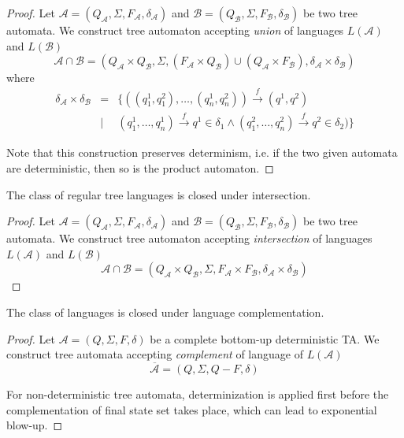 \begin{proof}
Let $\mathcal{A} = (Q_\mathcal{A}, \Sigma, F_\mathcal{A}, \delta_\mathcal{A})$ and $\mathcal{B} = (Q_\mathcal{B}, \Sigma, F_\mathcal{B}, \delta_\mathcal{B})$ be two tree automata. We construct tree automaton accepting \emph{union} of languages $L(\mathcal{A})$ and $L(\mathcal{B})$  $$\mathcal{A} \cap \mathcal{B} = (Q_\mathcal{A} \times Q_\mathcal{B}, \Sigma, (F_\mathcal{A} \times Q_\mathcal{B}) \cup (Q_\mathcal{A} \times F_\mathcal{B}), \delta_\mathcal{A} \times \delta_\mathcal{B})$$ where
 \begin{eqnarray*}
 \delta_\mathcal{A} \times \delta_\mathcal{B} & = & \{ ((q^1_1,q^2_1),\ldots,(q^1_n,q^2_n)) \overset{f}{\longrightarrow} (q^1, q^2)\\ 
  & | & (q^1_1,\ldots,q^1_n) \overset{f}{\longrightarrow} q^1 \in \delta_1 \wedge (q^2_1,\ldots,q^2_n) \overset{f}{\longrightarrow} q^2 \in \delta_2)\}
	\end{eqnarray*}

Note that this construction preserves determinism, i.e. if the two given automata are deterministic, then so is the product automaton.
\end{proof}

\begin{theorem}
 The class of regular tree languages is closed under intersection.
\end{theorem}

\begin{proof}
Let $\mathcal{A} = (Q_\mathcal{A}, \Sigma, F_\mathcal{A}, \delta_\mathcal{A})$ and $\mathcal{B} = (Q_\mathcal{B}, \Sigma, F_\mathcal{B}, \delta_\mathcal{B})$ be two tree automata. We construct tree automaton accepting \emph{intersection} of languages $L(\mathcal{A})$ and $L(\mathcal{B})$ $$\mathcal{A} \cap \mathcal{B} = (Q_\mathcal{A} 
\times Q_\mathcal{B}, \Sigma, F_\mathcal{A} \times F_\mathcal{B}, \delta_\mathcal{A} \times \delta_\mathcal{B})$$
\end{proof}

\begin{theorem}
 The class of languages is closed under language complementation.
\end{theorem}

\begin{proof}
Let $\mathcal{A} = (Q, \Sigma, F, \delta)$ be a complete bottom-up deterministic TA. We construct tree automata accepting \emph{complement} of language of $L(\mathcal{A})$ $$\overline{\mathcal{A}} = (Q, \Sigma, Q - F, \delta)$$

For non-deterministic tree automata, determinization is applied first before the complementation of final state set takes place, which can lead to exponential blow-up.
\end{proof}

